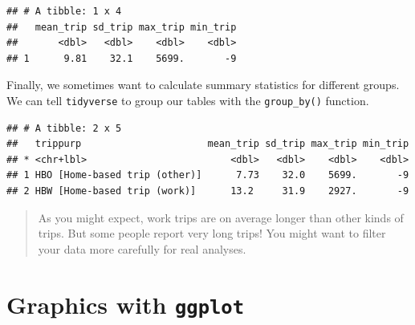 \documentclass[]{book}
\newenvironment{Shaded}{\begin{snugshade}}{\end{snugshade}}
\newcommand{\DataTypeTok}[1]{\textcolor[rgb]{0.13,0.29,0.53}{#1}}
\newcommand{\KeywordTok}[1]{\textcolor[rgb]{0.13,0.29,0.53}{\textbf{#1}}}
\newcommand{\NormalTok}[1]{#1}
\newcommand{\OperatorTok}[1]{\textcolor[rgb]{0.81,0.36,0.00}{\textbf{#1}}}
\newcommand{\StringTok}[1]{\textcolor[rgb]{0.31,0.60,0.02}{#1}}
\begin{document}
\begin{verbatim}
## # A tibble: 1 x 4
##   mean_trip sd_trip max_trip min_trip
##       <dbl>   <dbl>    <dbl>    <dbl>
## 1      9.81    32.1    5699.       -9
\end{verbatim}

Finally, we sometimes want to calculate summary statistics for different groups.
We can tell \texttt{tidyverse} to group our tables with the \texttt{group\_by()} function.

\begin{Shaded}
\end{Shaded}

\begin{verbatim}
## # A tibble: 2 x 5
##   trippurp                      mean_trip sd_trip max_trip min_trip
## * <chr+lbl>                         <dbl>   <dbl>    <dbl>    <dbl>
## 1 HBO [Home-based trip (other)]      7.73    32.0    5699.       -9
## 2 HBW [Home-based trip (work)]      13.2     31.9    2927.       -9
\end{verbatim}

\begin{quote}
As you might expect, work trips are on average longer than other kinds of trips.
But some people report very long trips! You might want to filter your data more
carefully for real analyses.
\end{quote}

\hypertarget{graphics-with-ggplot}{%
\section{\texorpdfstring{Graphics with \texttt{ggplot}}{Graphics with ggplot}}\label{graphics-with-ggplot}}


\end{document}
